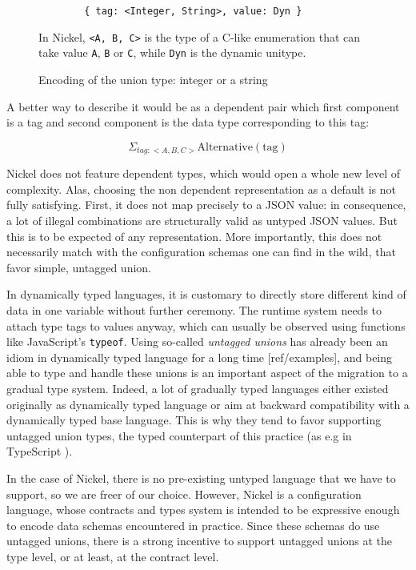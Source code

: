 \documentclass{article}
\begin{document}
\begin{figure}
  \begin{center}
    \begin{lstlisting}
        { tag: <Integer, String>, value: Dyn }
    \end{lstlisting}
  \end{center}
\caption{Encoding of the union type: integer or a string}
\label{fig:union-encoding}
\medskip
\small
In Nickel, \lstinline+<A, B, C>+ is the type of a C-like enumeration that can
take value \lstinline+A+, \lstinline+B+ or \lstinline+C+, while \lstinline+Dyn+
is the dynamic unitype.
\end{figure}

A better way to describe it would be as a dependent pair which first component
is a tag and second component is the data type corresponding to this tag:

\[
    \Sigma_{tag : <A, B, C>} \text{Alternative}(\text{tag})
\]

Nickel does not feature dependent types, which would open a whole new level of
complexity. Alas, choosing the non dependent representation as a default is not
fully satisfying.  First, it does not map precisely to a JSON value: in
consequence, a lot of illegal combinations are structurally valid as untyped
JSON values. But this is to be expected of any representation. More importantly,
this does not necessarily match with the configuration schemas one can find in
the wild, that favor simple, untagged union.

In dynamically typed languages, it is customary to directly store different kind
of data in one variable without further ceremony. The runtime system needs to
attach type tags to values anyway, which can usually be observed using functions
like JavaScript's \verb+typeof+. Using so-called \emph{untagged unions} has
already been an idiom in dynamically typed language for a long time
[ref/examples], and being able to type and handle these unions is an important
aspect of the migration to a gradual type system. Indeed, a lot of gradually
typed languages either existed originally as dynamically typed language or aim
at backward compatibility with a dynamically typed base language. This is why
they tend to favor supporting untagged union types, the typed counterpart of
this practice (as e.g in TypeScript \cite{TypeScriptUnions}).

In the case of Nickel, there is no pre-existing untyped language that we have to
support, so we are freer of our choice. However, Nickel is a configuration
language, whose contracts and types system is intended to be expressive enough
to encode data schemas encountered in practice. Since these schemas do use
untagged unions, there is a strong incentive to support untagged unions at the
type level, or at least, at the contract level.
\end{document}
